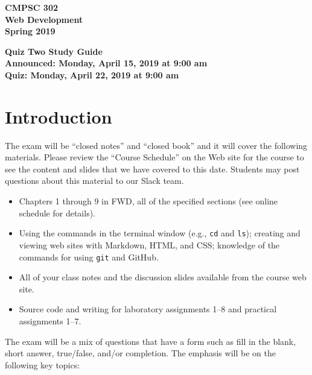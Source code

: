 \documentclass[11pt]{article}
\newcommand{\assignmentduedate}{April 22}
\newcommand{\assignmentassignedate}{April 15}
\newcommand{\assignmentnumber}{Two}
\newcommand{\labyear}{2019}
\newcommand{\assignedday}{Monday}
\newcommand{\dueday}{Monday}
\newcommand{\labtime}{9:00 am}
\newcommand{\assigneddate}{Announced: \assignedday, \assignmentassignedate, \labyear{} at \labtime{}}
\newcommand{\duedate}{Quiz: \dueday, \assignmentduedate, \labyear{} at \labtime{}}
\newcommand{\program}[1]{\lstinline{#1}}
\newcommand{\guidetitle}[1]
{
  \begin{center}
    \begin{center}
      \bf
      CMPSC 302\\Web Development\\
      Spring 2019\\
      \medskip
    \end{center}
    \bf
    #1
  \end{center}
}
\begin{document}
\thispagestyle{empty}

\guidetitle{Quiz \assignmentnumber{} Study Guide \\ \assigneddate{} \\ \duedate{}}

\section*{Introduction}

\noindent
The exam will be ``closed notes'' and ``closed book'' and it will cover the
following materials. Please review the ``Course Schedule'' on the Web site for
the course to see the content and slides that we have covered to this date.
Students may post questions about this material to our Slack team.

\begin{itemize}

  \itemsep 0in

  \item Chapters 1 through 9 in FWD, all of the specified sections (see online
    schedule for details).

  \item Using the commands in the terminal window (e.g., \program{cd} and
    \program{ls}); creating and viewing web sites with Markdown, HTML, and CSS;
    knowledge of the commands for using \program{git} and GitHub.

  \item All of your class notes and the discussion slides available from the
    course web site.

  \item Source code and writing for laboratory assignments 1--8 and practical
    assignments 1--7.

\end{itemize}

\noindent The exam will be a mix of questions that have a form such as fill in
the blank, short answer, true/false, and/or completion. The emphasis will be on
the following key topics:
\end{document}
